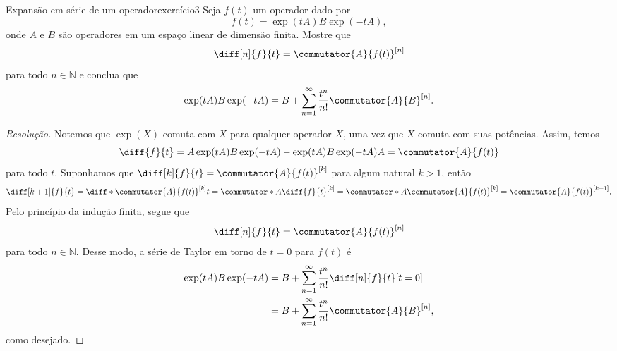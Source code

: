 \setcounter{tcb@cnt@exercício}{2}
\begin{exercício}{Expansão em série de um operador}{exercício3}
    Seja \(f(t)\) um operador dado por
    \begin{equation*}
        f(t) = \exp(tA) B\exp(-tA),
    \end{equation*}
    onde \(A\) e \(B\) são operadores em um espaço linear de dimensão finita. Mostre que
    \begin{equation*}
        \diff[n]{f}{t} = \commutator{A}{f(t)}^{[n]}
    \end{equation*}
    para todo \(n \in \mathbb{N}\) e conclua que
    \begin{equation*}
        \exp(tA)B\exp(-tA) = B + \sum_{n = 1}^\infty \frac{t^n}{n!}\commutator{A}{B}^{[n]}.
    \end{equation*}
\end{exercício}
\begin{proof}[Resolução]
    Notemos que \(\exp(X)\) comuta com \(X\) para qualquer operador \(X\), uma vez que \(X\) comuta com suas potências. Assim, temos
    \begin{equation*}
        \diff{f}{t} = A \exp(tA) B\exp(-tA) - \exp(tA) B\exp(-tA) A = \commutator{A}{f(t)}
    \end{equation*}
    para todo \(t\). Suponhamos que \(\diff[k]{f}{t} = \commutator{A}{f(t)}^{[k]}\) para algum natural \(k > 1\), então
    \begin{equation*}
        \diff[k+1]{f}{t} = \diff*{\commutator{A}{f(t)}^{[k]}}{t} = \commutator*{A}{\diff{f}{t}}^{[k]} = \commutator*{A}{\commutator{A}{f(t)}}^{[k]} = \commutator{A}{f(t)}^{[k+1]}.
    \end{equation*}
    Pelo princípio da indução finita, segue que
    \begin{equation*}
        \diff[n]{f}{t} = \commutator{A}{f(t)}^{[n]}
    \end{equation*}
    para todo \(n \in \mathbb{N}\). Desse modo, a série de Taylor em torno de \(t = 0\) para \(f(t)\) é
    \begin{align*}
        \exp(tA)B\exp(-tA) &= B + \sum_{n = 1}^{\infty} \frac{t^n}{n!}\diff[n]{f}{t}[t=0]\\
                           &= B + \sum_{n = 1}^{\infty} \frac{t^n}{n!}\commutator{A}{B}^{[n]},
    \end{align*}
    como desejado.
\end{proof}
